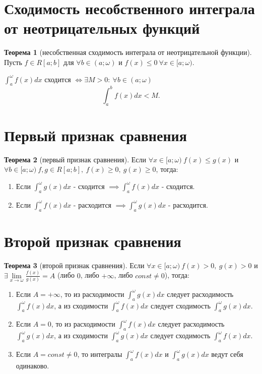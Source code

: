\documentclass{report}
\theoremstyle{definition}
\newtheorem*{theorem}{Теорема}
\begin{document}
\section{Сходимость несобственного интеграла от неотрицательных функций}

\begin{theorem}[несобственная сходимость интеграла от неотрицательной функции]
    Пусть $f\in R[a;b]$ для $\forall b \in (a;\omega)$ и $f(x)\leqslant 0 \ \forall x \in [a;\omega).$

    $\int_{a}^{\omega}f(x)dx$ сходится $\iff \exists M > 0: \ \forall b \in (a;\omega)$
    \begin{equation*}
        \int_{a}^{b}f(x)dx < M.
    \end{equation*}
\end{theorem}

\section{Первый признак сравнения}

\begin{theorem}[первый признак сравнения]
    Если $\forall x \in [a;\omega) \ f(x) \leqslant g(x)$ и $\forall b \in [a;\omega) \ f,g \in R[a;b], \
        f(x) \geqslant 0, \ g(x) \geqslant 0$, тогда:
    \begin{enumerate}
        \item Если $\int_{a}^{\omega}g(x)dx$ - сходится $\implies \int_{a}^{\omega}f(x)dx$ - сходится.
        \item Если $\int_{a}^{\omega}f(x)dx$ - расходится $\implies \int_{a}^{\omega}g(x)dx$ - расходится.
    \end{enumerate}
\end{theorem}

\section{Второй признак сравнения}

\begin{theorem}[второй признак сравнения]
    Если $\forall x \in [a;\omega) \ f(x) > 0, \ g(x) > 0$ и $\exists \underset{x\rightarrow \omega}{\lim}
        \frac{f(x)}{g(x)} = A$ (либо $0$, либо $+\infty$, либо $const \ne 0$), тогда:
    \begin{enumerate}
        \item Если $A = +\infty$, то из расходимости $\int_{a}^{\omega}g(x)dx$ следует расходимость $\int_{a}^{\omega}
                  f(x)dx$, а из сходимости $\int_{a}^{\omega}f(x)dx$ следует сходимость $\int_{a}^{\omega}g(x)dx$.
        \item Если $A = 0$, то из расходимости $\int_{a}^{\omega}f(x)dx$ следует расходимость $\int_{a}^{\omega}
                  g(x)dx$, а из сходимости $\int_{a}^{\omega}g(x)dx$ следует сходимость $\int_{a}^{\omega}f(x)dx$.
        \item Если $A = const \ne 0$, то интегралы $\int_{a}^{\omega}f(x)dx$ и $\int_{a}^{\omega}g(x)dx$ ведут
              себя одинаково.
    \end{enumerate}
\end{theorem}
\end{document}
